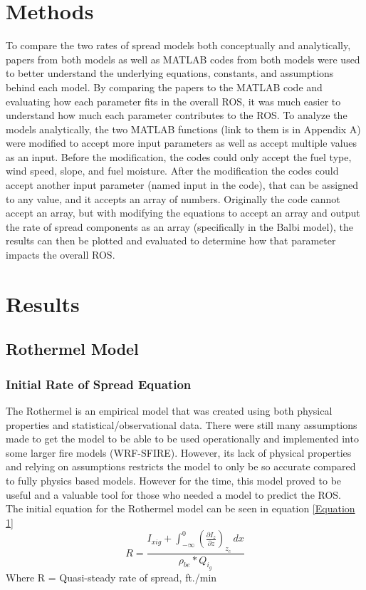\documentclass{article}
\begin{document}
\section{Methods}
To compare the two rates of spread models both conceptually and analytically, papers from both models as well as MATLAB codes from both models were used to better understand the underlying equations, constants, and assumptions behind each model. By comparing the papers to the MATLAB code and evaluating how each parameter fits in the overall ROS, it was much easier to understand how much each parameter contributes to the ROS. 
To analyze the models analytically, the two MATLAB functions (link to them is in Appendix A) were modified to accept more input parameters as well as accept multiple values as an input. Before the modification, the codes could only accept the fuel type, wind speed, slope, and fuel moisture. After the modification the codes could accept another input parameter (named input in the code), that can be assigned to any value, and it accepts an array of numbers. Originally the code cannot accept an array, but with modifying the equations to accept an array and output the rate of spread components as an array (specifically in the Balbi model), the results can then be plotted and evaluated to determine how that parameter impacts the overall ROS. 

\section{Results}
\subsection{Rothermel Model}
\subsubsection{Initial Rate of Spread Equation}
\indent The Rothermel is an empirical model that was created using both physical properties and statistical/observational data. There were still many assumptions made to get the model to be able to be used operationally and implemented into some larger fire models (WRF-SFIRE). However, its lack of physical properties and relying on assumptions restricts the model to only be so accurate compared to fully physics based models. However for the time, this model proved to be useful and a valuable tool for those who needed a model to predict the ROS. \\
\indent The initial equation for the Rothermel model can be seen in equation \ref{Equation 1}
\begin{equation} 
\label{Equation 1}
R = \frac {I_{xig} + \int_{-\infty}^{0} (\frac {\partial I_{z}} {\partial z})_{z_c}\,dx }{\rho_{be} * Q_{i_g}}
\end{equation}
Where R = Quasi-steady rate of spread, ft./min \\
\end{document}
